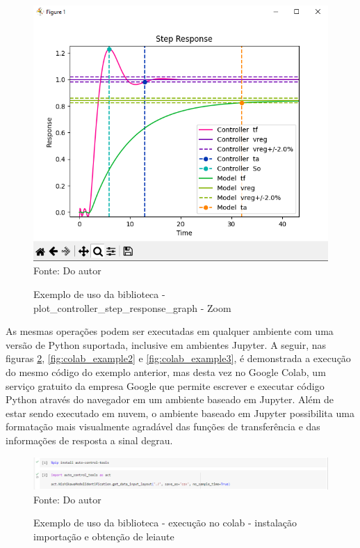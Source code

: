 \begin{figure}[H]
    \centering
    \caption{Exemplo de uso da biblioteca - plot\_controller\_step\_response\_graph - Zoom}
    \includegraphics[scale=0.6]{figuras/get_controller_plot_zoom}
    \label{fig:get_controller_plot_zoom}
    \\
    \vspace{0cm}\hspace{0cm}\small{Fonte: Do autor}
\end{figure}

As mesmas operações podem ser executadas em qualquer ambiente com uma versão de Python suportada, inclusive em
ambientes Jupyter.
A seguir, nas figuras \ref{fig:colab_example1}, \ref{fig:colab_example2} e \ref{fig:colab_example3}, é demonstrada a
execução do mesmo código do exemplo anterior, mas desta vez no Google Colab, um serviço gratuito da empresa Google que
permite escrever e executar código Python através do navegador em um ambiente baseado em Jupyter.
Além de estar sendo executado em nuvem, o ambiente baseado em Jupyter possibilita uma formatação mais visualmente
agradável das funções de transferência e das informações de resposta a sinal degrau.

\begin{figure}[H]
    \centering
    \caption{Exemplo de uso da biblioteca - execução no colab - instalação importação e obtenção de leiaute}
    \includegraphics[scale=0.5]{figuras/colab_example1}
    \label{fig:colab_example1}
    \\
    \vspace{0cm}\hspace{0cm}\small{Fonte: Do autor}
\end{figure}

